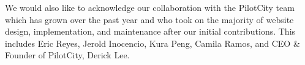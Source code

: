 \documentclass[mathematics,finalreport]{hmcclinic}
\begin{document}
We would also like to acknowledge our collaboration with the PilotCity team which has grown over the past year and who took on the majority of website design, implementation, and maintenance after our initial contributions. This includes Eric Reyes, Jerold Inocencio, Kura Peng, Camila Ramos, and CEO \& Founder of PilotCity, Derick Lee.



\tableofcontents




\mainmatter





\end{document}
